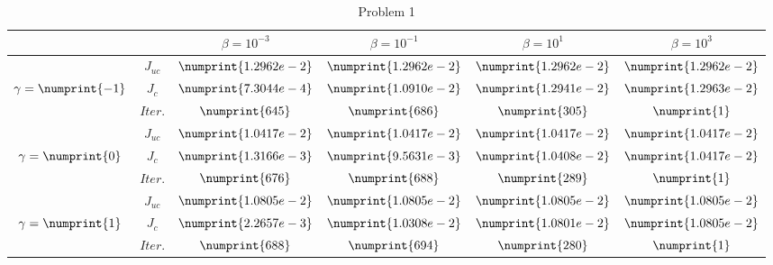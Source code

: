 \begin{table}
\begin{tabular}{ ||c|| c | c | c | c | c ||}
\hline
& & $\beta = 10^{-3}$ & $\beta = 10^{-1}$ & $\beta = 10^{1}$ & $\beta = 10^{3}$  \\
\hline
 & $J_{uc}$ & $\numprint{1.2962e-2}$ & $\numprint{1.2962e-2}$ & $\numprint{1.2962e-2}$ & $\numprint{1.2962e-2}$ \\
$\gamma= \numprint{-1}$  & $J_c$ & $\numprint{7.3044e-4}$ & $\numprint{1.0910e-2}$ & $\numprint{1.2941e-2}$ & $\numprint{1.2963e-2}$ \\
& $Iter.$ & $\numprint{645}$ & $\numprint{686}$ & $\numprint{305}$ & $\numprint{1}$ \\
\hline
 & $J_{uc}$ & $\numprint{1.0417e-2}$ & $\numprint{1.0417e-2}$ & $\numprint{1.0417e-2}$ & $\numprint{1.0417e-2}$ \\
$\gamma= \numprint{0}$  & $J_c$ & $\numprint{1.3166e-3}$ & $\numprint{9.5631e-3}$ & $\numprint{1.0408e-2}$ & $\numprint{1.0417e-2}$ \\
& $Iter.$ & $\numprint{676}$ & $\numprint{688}$ & $\numprint{289}$ & $\numprint{1}$ \\
\hline
 & $J_{uc}$ & $\numprint{1.0805e-2}$ & $\numprint{1.0805e-2}$ & $\numprint{1.0805e-2}$ & $\numprint{1.0805e-2}$ \\
$\gamma= \numprint{1}$  & $J_c$ & $\numprint{2.2657e-3}$ & $\numprint{1.0308e-2}$ & $\numprint{1.0801e-2}$ & $\numprint{1.0805e-2}$ \\
& $Iter.$ & $\numprint{688}$ & $\numprint{694}$ & $\numprint{280}$ & $\numprint{1}$ \\
\hline
\end{tabular}
\caption{Problem 1}
\label{TabS5:Prob12D}
\end{table}